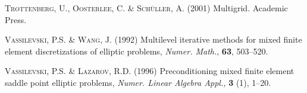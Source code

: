 \documentclass{imamci}
\numberwithin{equation}{section}
\begin{document}
\begin{references}
\item{}
\textsc{Trottenberg, U., Oosterlee, C. \& Sch\"uller, A.} (2001)  {Multigrid.}
 {Academic Press.}

\item{}
\textsc{Vassilevski, P.S. \& Wang, J.} (1992)  {Multilevel iterative
methods for mixed finite element discretizations of elliptic problems},  {\em
Numer. Math.},   \textbf{63}, 503--520.

\item{}
\textsc{Vassilevski, P.S. \& Lazarov, R.D.} (1996)  {Preconditioning
mixed finite element saddle point elliptic problems,}  {\em Numer.
Linear Algebra Appl.,}   \textbf{3} (1), 1--20.
\end{references}
\end{document}
